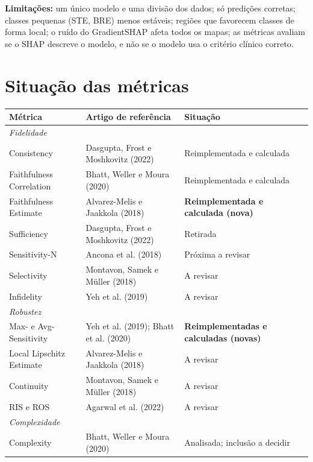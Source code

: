 \documentclass[11pt,a4paper]{article}
\begin{document}
\textbf{Limitações:} um único modelo e uma divisão dos dados; só predições corretas; classes pequenas (STE, BRE) menos estáveis; regiões que favorecem classes de forma local; o ruído do GradientSHAP afeta todos os mapas; as métricas avaliam se o SHAP descreve o modelo, e não se o modelo usa o critério clínico correto.

\section{Situação das métricas}
\begin{table}[H]
\centering
\small
\begin{tabularx}{\textwidth}{lXl}
\toprule
\textbf{Métrica} & \textbf{Artigo de referência} & \textbf{Situação} \\
\midrule
\multicolumn{3}{l}{\textit{Fidelidade}} \\
Consistency & Dasgupta, Frost e Moshkovitz (2022) & Reimplementada e calculada \\
Faithfulness Correlation & Bhatt, Weller e Moura (2020) & Reimplementada e calculada \\
Faithfulness Estimate & Alvarez-Melis e Jaakkola (2018) & \textbf{Reimplementada e calculada (nova)} \\
Sufficiency & Dasgupta, Frost e Moshkovitz (2022) & Retirada \\
Sensitivity-N & Ancona et al. (2018) & Próxima a revisar \\
Selectivity & Montavon, Samek e Müller (2018) & A revisar \\
Infidelity & Yeh et al. (2019) & A revisar \\
\midrule
\multicolumn{3}{l}{\textit{Robustez}} \\
Max- e Avg-Sensitivity & Yeh et al. (2019); Bhatt et al. (2020) & \textbf{Reimplementadas e calculadas (novas)} \\
Local Lipschitz Estimate & Alvarez-Melis e Jaakkola (2018) & A revisar \\
Continuity & Montavon, Samek e Müller (2018) & A revisar \\
RIS e ROS & Agarwal et al. (2022) & A revisar \\
\midrule
\multicolumn{3}{l}{\textit{Complexidade}} \\
Complexity & Bhatt, Weller e Moura (2020) & Analisada; inclusão a decidir \\
\bottomrule
\end{tabularx}
\end{table}
\end{document}
